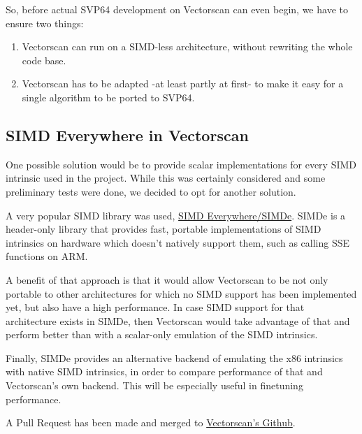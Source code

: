 So, before actual \acrshort{SVP64} development on Vectorscan can even begin, we have to ensure two things:

\begin{enumerate}
  \item Vectorscan can run on a \acrshort{SIMD}-less architecture, without rewriting the whole code base.
  \item Vectorscan has to be adapted -at least partly at first- to make it easy for a single algorithm to be ported to \acrshort{SVP64}.
\end{enumerate}

\subsection{SIMD Everywhere in Vectorscan}

One possible solution would be to provide scalar implementations for every \acrshort{SIMD} intrinsic used in the project.
While this was certainly considered and some preliminary tests were done, we decided to opt for another solution.
\par

A very popular \acrshort{SIMD} library was used, \href{https://github.com/simd-everywhere/simde}{SIMD Everywhere/SIMDe}.
SIMDe is a header-only library that provides fast, portable implementations of \acrshort{SIMD} intrinsics on hardware which doesn't natively support them, such as calling \acrshort{SSE} functions on \acrshort{ARM}.
\par

A benefit of that approach is that it would allow Vectorscan to be not only portable to other architectures
for which no \acrshort{SIMD} support has been implemented yet, but also have a high performance.
In case \acrshort{SIMD} support for that architecture exists in SIMDe,
then Vectorscan would take advantage of that and perform better than with a scalar-only emulation of the \acrshort{SIMD} intrinsics.
\par

Finally, SIMDe provides an alternative backend of emulating the x86 intrinsics with native SIMD intrinsics,
in order to compare performance of that and Vectorscan's own backend.
This will be especially useful in finetuning performance.
\par

A Pull Request has been made and merged to \href{https://github.com/VectorCamp/vectorscan/pull/203}{Vectorscan's Github}.
\par

